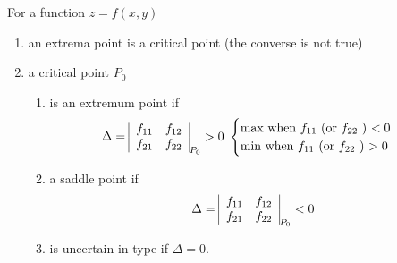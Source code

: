 \documentclass[11pt]{amsbook}
\begin{document}

\begin{thm}
 
 For a function $ z = f(x , y) $
 
 \begin{enumerate}  
  
  \item
    an extrema point is a critical point (the converse is not true)
  
  
  \item
    a critical point $ P_{0} $
  
    \begin{enumerate}
   
     \item 
       is an extremum point if
       \[
        \Delta =        
        \begin{tabular}{|c|}        
         $ f_{11} \quad f_{12} $ \\
         $ f_{21} \quad f_{22} $         
        \end{tabular}_{ P_{0} }        
        > 0 \, \,      
        \begin{cases}
         \text{max when $ f_{11} $ (or $ f_{22} $ ) $ < 0 $} \\
         \text{min when $ f_{11} $ (or $ f_{22} $ ) $ > 0 $}
        \end{cases}
       \]

       
     \item 
       a saddle point if
       \[
        \Delta =        
        \begin{tabular}{|c|}
         $ f_{11} \quad f_{12} $ \\
         $ f_{21} \quad f_{22} $
        \end{tabular}_{ P_{0} }        
        < 0
       \]
   
   
     \item
       is uncertain in type if $ \Delta = 0 $.
   
    \end{enumerate}
  
 \end{enumerate}
 
\end{thm}
\end{document}
